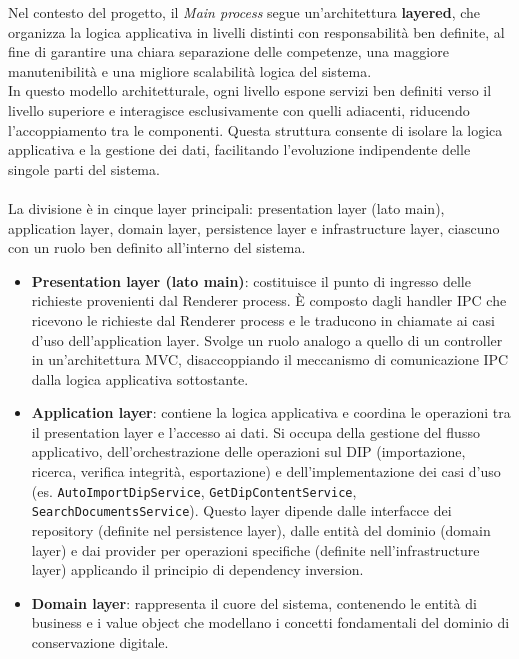 \documentclass[a4paper,12pt]{article}
\begin{document}
{{{                \noindent Nel contesto del progetto, il \textit{Main process} segue un'architettura \textbf{layered}, che organizza la logica applicativa in livelli distinti con responsabilità ben definite, al fine di garantire una chiara separazione delle competenze, una maggiore manutenibilità e una migliore scalabilità logica del sistema.\\
                In questo modello architetturale, ogni livello espone servizi ben definiti verso il livello superiore e interagisce esclusivamente con quelli adiacenti, riducendo l'accoppiamento tra le componenti.
                Questa struttura consente di isolare la logica applicativa e la gestione dei dati, facilitando l'evoluzione indipendente delle singole parti del sistema.\\\\
                La divisione è in cinque layer principali: presentation layer (lato main), application layer, domain layer, persistence layer e infrastructure layer, ciascuno con un ruolo ben definito all'interno del sistema.
                \begin{itemize}
                    \item \textbf{Presentation layer (lato main)}: costituisce il punto di ingresso delle richieste provenienti dal Renderer process.
                    È composto dagli handler IPC che ricevono le richieste dal Renderer process e le traducono in chiamate ai casi d'uso dell'application layer.
                    Svolge un ruolo analogo a quello di un controller in un'architettura MVC, disaccoppiando il meccanismo di comunicazione IPC dalla logica applicativa sottostante.
                    \item \textbf{Application layer}: contiene la logica applicativa e coordina le operazioni tra il presentation layer e l'accesso ai dati. 
                    Si occupa della gestione del flusso applicativo, dell'orchestrazione delle operazioni sul DIP (importazione, ricerca, verifica integrità, esportazione) e dell'implementazione dei casi d'uso (es. \texttt{AutoImportDipService}, \texttt{GetDipContentService}, \texttt{SearchDocumentsService}).
                    Questo layer dipende dalle interfacce dei repository (definite nel persistence layer), dalle entità del dominio (domain layer) e dai provider per operazioni specifiche (definite nell'infrastructure layer) applicando il principio di dependency inversion.
                    \item \textbf{Domain layer}: rappresenta il cuore del sistema, contenendo le entità di business e i value object che modellano i concetti fondamentali del dominio di conservazione digitale.

\end{itemize}}}}
\end{document}
